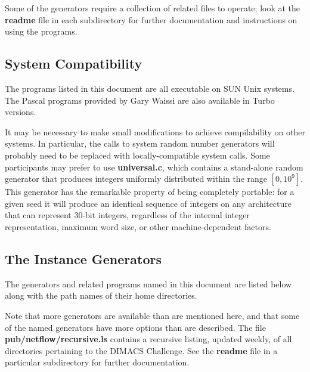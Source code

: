 Some of the generators require a collection of related files to
operate; look at the {\bf readme} file in each subdirectory for
further documentation and instructions on using the programs.

\subsection{System Compatibility}

The programs listed in this document are all executable on SUN Unix
systems.  The Pascal programs provided by Gary Waissi are also
available in Turbo versions.  

It may be necessary to make small modifications to achieve
compilability on other systems.  In particular, the calls to system
random number generators will probably need to be replaced with
locally-compatible system calls.  Some participants may prefer to use
{\bf universal.c}, which contains a stand-alone random
generator that produces integers uniformly distributed within the
range $[0, 10^9]$.  This generator has the remarkable property of
being completely portable: for a given seed it will produce an
identical sequence of integers on any architecture that can represent
30-bit integers, regardless of the internal integer representation,
maximum word size, or other machine-dependent factors.

\subsection{The Instance Generators}

The generators and related programs named in this document are listed
below along with the path names of their home directories.

Note that more generators are available than are mentioned here, and
that some of the named generators have more options than are
described.  The file {\bf pub/netflow/recursive.ls} contains a
recursive listing, updated weekly, of all directories pertaining to
the DIMACS Challenge.  See the {\bf readme} file in a particular
subdirectory for further documentation.

